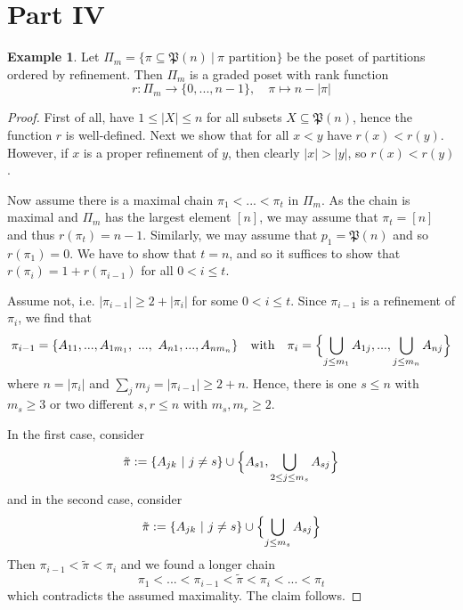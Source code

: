\documentclass{scrartcl}
\newcommand{\powerset}{\mathfrak{P}}
\theoremstyle{definition}
\newtheorem{example}[definition]{Example}
\begin{document}
\section{Part IV}
\begin{example}
    Let $\Pi_m = \{ \pi \subseteq \powerset(n) \ | \ \text{$\pi$ partition} \}$ be the poset of partitions ordered by refinement.
    Then $\Pi_m$ is a graded poset with rank function
    \begin{equation*}
        r: \Pi_m \to \{ 0, ..., n - 1 \}, \quad \pi \mapsto n - |\pi|
    \end{equation*}
\end{example}
\begin{proof}
    First of all, have $1 \leq |X| \leq n$ for all subsets $X \subseteq \powerset(n)$, hence the function $r$ is well-defined.
    Next we show that for all $x < y$ have $r(x) < r(y)$.
    However, if $x$ is a proper refinement of $y$, then clearly $|x| > |y|$, so $r(x) < r(y)$.

    Now assume there is a maximal chain $\pi_1 < ... < \pi_t$ in $\Pi_m$.
    As the chain is maximal and $\Pi_m$ has the largest element $[n]$, we may assume that $\pi_t = [n]$ and thus $r(\pi_t) = n - 1$.
    Similarly, we may assume that $p_1 = \powerset(n)$ and so $r(\pi_1) = 0$.
    We have to show that $t = n$, and so it suffices to show that $r(\pi_i) = 1 + r(\pi_{i - 1})$ for all $0 < i \leq t$.

    Assume not, i.e. $|\pi_{i - 1}| \geq 2 + |\pi_i|$ for some $0 < i \leq t$.
    Since $\pi_{i - 1}$ is a refinement of $\pi_i$, we find that
    \begin{equation*}
        \pi_{i - 1} = \{ A_{11}, ..., A_{1m_1}, \ ..., \ A_{n1}, ..., A_{nm_n} \} \quad \text{with} \quad \pi_i = \Bigl\{ \bigcup_{j \leq m_1} A_{1j}, ..., \bigcup_{j \leq m_n} A_{nj} \Bigr\}
    \end{equation*}
    where $n = |\pi_i|$ and $\sum_j m_j = |\pi_{i - 1}| \geq 2 + n$.
    Hence, there is one $s \leq n$ with $m_s \geq 3$ or two different $s, r \leq n$ with $m_s, m_r \geq 2$.
    
    In the first case, consider
    \begin{equation*}
        \tilde{\pi} := \{ A_{jk} \ | \ j \neq s \} \cup \Bigl\{ A_{s1}, \bigcup_{2 \leq j \leq m_s} A_{sj} \Bigr\}
    \end{equation*}
    and in the second case, consider
    \begin{equation*}
        \tilde{\pi} := \{ A_{jk} \ | \ j \neq s \} \cup \Bigl\{ \bigcup_{j \leq m_s} A_{sj} \Bigr\}
    \end{equation*}
    Then $\pi_{i - 1} < \tilde{\pi} < \pi_i$ and we found a longer chain
    \begin{equation*}
        \pi_1 < ... < \pi_{i - 1} < \tilde{\pi} < \pi_i < ... < \pi_t
    \end{equation*}
    which contradicts the assumed maximality. The claim follows.
\end{proof}
\end{document}
